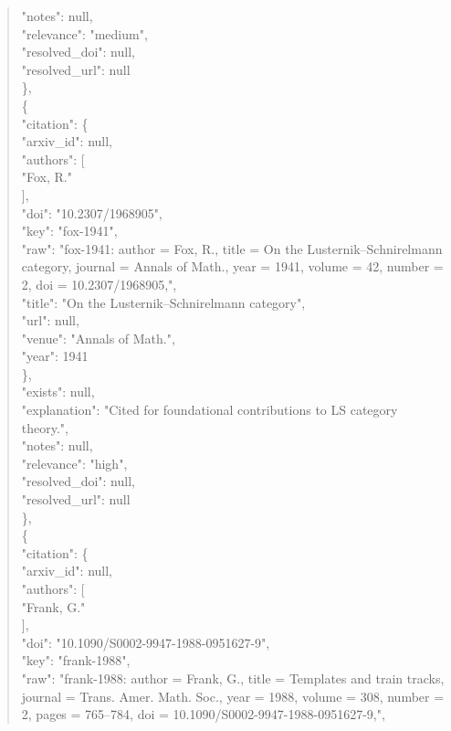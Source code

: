 \documentclass[11pt]{article}
\begin{document}
\begin{quote}
      "notes": null,\\
      "relevance": "medium",\\
      "resolved\_doi": null,\\
      "resolved\_url": null\\
    \},\\
    \{\\
      "citation": \{\\
        "arxiv\_id": null,\\
        "authors": [\\
          "Fox, R."\\
        ],\\
        "doi": "10.2307/1968905",\\
        "key": "fox-1941",\\
        "raw": "fox-1941: author = Fox, R., title = On the Lusternik--Schnirelmann category, journal = Annals of Math., year = 1941, volume = 42, number = 2, doi = 10.2307/1968905,",\\
        "title": "On the Lusternik--Schnirelmann category",\\
        "url": null,\\
        "venue": "Annals of Math.",\\
        "year": 1941\\
      \},\\
      "exists": null,\\
      "explanation": "Cited for foundational contributions to LS category theory.",\\
      "notes": null,\\
      "relevance": "high",\\
      "resolved\_doi": null,\\
      "resolved\_url": null\\
    \},\\
    \{\\
      "citation": \{\\
        "arxiv\_id": null,\\
        "authors": [\\
          "Frank, G."\\
        ],\\
        "doi": "10.1090/S0002-9947-1988-0951627-9",\\
        "key": "frank-1988",\\
        "raw": "frank-1988: author = Frank, G., title = Templates and train tracks, journal = Trans. Amer. Math. Soc., year = 1988, volume = 308, number = 2, pages = 765--784, doi = 10.1090/S0002-9947-1988-0951627-9,",\\

\end{quote}
\end{document}
